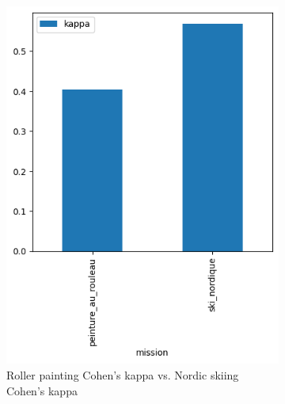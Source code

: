 \documentclass[francais,RandD]{rapportPFE}
\begin{document}
		\begin{figure}[h!]
			\begin{subfigure}[t]{0.49\linewidth}
				\includegraphics[width=\linewidth]{graphics/peinture_au_rouleau-kappa_vs_ski_nordique-kappa.png}
				\caption{Roller painting Cohen's kappa vs. Nordic skiing Cohen's kappa}
				\label{fig:peinture_au_rouleau-kappa_vs_ski_nordique-kappa}
			\end{subfigure}
			\hfill
			\begin{subfigure}[t]{0.49\linewidth}

\end{subfigure}
\end{figure}
\end{document}
